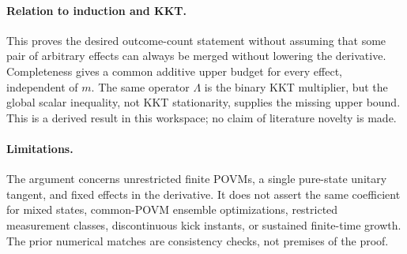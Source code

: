 \documentclass[11pt,a4paper]{article}
\begin{document}
\paragraph{Relation to induction and KKT.} This proves the desired outcome-count statement without assuming that some pair of arbitrary effects can always be merged without lowering the derivative. Completeness gives a common additive upper budget for every effect, independent of $m$. The same operator $\Lambda$ is the binary KKT multiplier, but the global scalar inequality, not KKT stationarity, supplies the missing upper bound. This is a derived result in this workspace; no claim of literature novelty is made.
\paragraph{Limitations.} The argument concerns unrestricted finite POVMs, a single pure-state unitary tangent, and fixed effects in the derivative. It does not assert the same coefficient for mixed states, common-POVM ensemble optimizations, restricted measurement classes, discontinuous kick instants, or sustained finite-time growth. The prior numerical matches are consistency checks, not premises of the proof.
\end{document}
